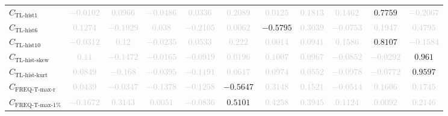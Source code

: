 \documentclass{standalone}
\newcommand{\tlhistonename}{\text{TL-hist1}}
\newcommand{\tlhistone}{C_{\tlhistonename}}
\newcommand{\tlhistsixname}{\text{TL-hist6}}
\newcommand{\tlhistsix}{C_{\tlhistsixname}}
\newcommand{\tlhisttenname}{\text{TL-hist10}}
\newcommand{\tlhistten}{C_{\tlhisttenname}}
\newcommand{\tlskewhistname}{\text{TL-hist-skew}}
\newcommand{\tlskewhist}{C_{\tlskewhistname}}
\newcommand{\tlkurthistname}{\text{TL-hist-kurt}}
\newcommand{\tlkurthist}{C_{\tlkurthistname}}
\newcommand{\freqmaxrname}{\text{FREQ-T-max-r}}
\newcommand{\freqmaxr}{C_{\freqmaxrname}}
\newcommand{\freqmaxonename}{\text{FREQ-T-max-1\%}}
\newcommand{\freqmaxone}{C_{\freqmaxonename}}
\begin{document}
\begin{tabular}{lcccccccccc}
$\tlhistone$ & \textcolor{lightgray}{$-0.0102$} & \textcolor{lightgray}{$0.0966$} & \textcolor{lightgray}{$-0.0486$} & \textcolor{lightgray}{$0.0336$} & \textcolor{lightgray}{$0.2089$} & \textcolor{lightgray}{$0.0125$} & \textcolor{lightgray}{$0.1813$} & \textcolor{lightgray}{$0.1462$} & $0.7759$ & \textcolor{lightgray}{$-0.2067$} \\ 
$\tlhistsix$ & \textcolor{lightgray}{$0.1274$} & \textcolor{lightgray}{$-0.1929$} & \textcolor{lightgray}{$0.038$} & \textcolor{lightgray}{$-0.2105$} & \textcolor{lightgray}{$0.0062$} & $-0.5795$ & \textcolor{lightgray}{$0.3039$} & \textcolor{lightgray}{$-0.0753$} & \textcolor{lightgray}{$0.1947$} & \textcolor{lightgray}{$0.4795$} \\ 
$\tlhistten$ & \textcolor{lightgray}{$-0.0312$} & \textcolor{lightgray}{$0.12$} & \textcolor{lightgray}{$-0.0235$} & \textcolor{lightgray}{$0.0533$} & \textcolor{lightgray}{$0.222$} & \textcolor{lightgray}{$0.0014$} & \textcolor{lightgray}{$0.0941$} & \textcolor{lightgray}{$0.1586$} & $0.8107$ & \textcolor{lightgray}{$-0.1584$} \\ 
$\tlskewhist$ & \textcolor{lightgray}{$0.11$} & \textcolor{lightgray}{$-0.1472$} & \textcolor{lightgray}{$-0.0165$} & \textcolor{lightgray}{$-0.0919$} & \textcolor{lightgray}{$0.0196$} & \textcolor{lightgray}{$0.1007$} & \textcolor{lightgray}{$0.0967$} & \textcolor{lightgray}{$-0.0852$} & \textcolor{lightgray}{$-0.0292$} & $0.961$ \\ 
$\tlkurthist$ & \textcolor{lightgray}{$0.0849$} & \textcolor{lightgray}{$-0.168$} & \textcolor{lightgray}{$-0.0395$} & \textcolor{lightgray}{$-0.1191$} & \textcolor{lightgray}{$0.0617$} & \textcolor{lightgray}{$0.0974$} & \textcolor{lightgray}{$0.0552$} & \textcolor{lightgray}{$-0.0978$} & \textcolor{lightgray}{$-0.0772$} & $0.9597$ \\ 
$\freqmaxr$ & \textcolor{lightgray}{$0.0439$} & \textcolor{lightgray}{$-0.0347$} & \textcolor{lightgray}{$-0.1378$} & \textcolor{lightgray}{$-0.1258$} & $-0.5647$ & \textcolor{lightgray}{$0.3148$} & \textcolor{lightgray}{$0.1521$} & \textcolor{lightgray}{$-0.0514$} & \textcolor{lightgray}{$0.1606$} & \textcolor{lightgray}{$0.1745$} \\ 
$\freqmaxone$ & \textcolor{lightgray}{$-0.1672$} & \textcolor{lightgray}{$0.3143$} & \textcolor{lightgray}{$0.0051$} & \textcolor{lightgray}{$-0.0836$} & $0.5101$ & \textcolor{lightgray}{$0.4258$} & \textcolor{lightgray}{$0.3945$} & \textcolor{lightgray}{$0.1124$} & \textcolor{lightgray}{$0.0092$} & \textcolor{lightgray}{$0.2146$} \\ 

\end{tabular}
\end{document}
